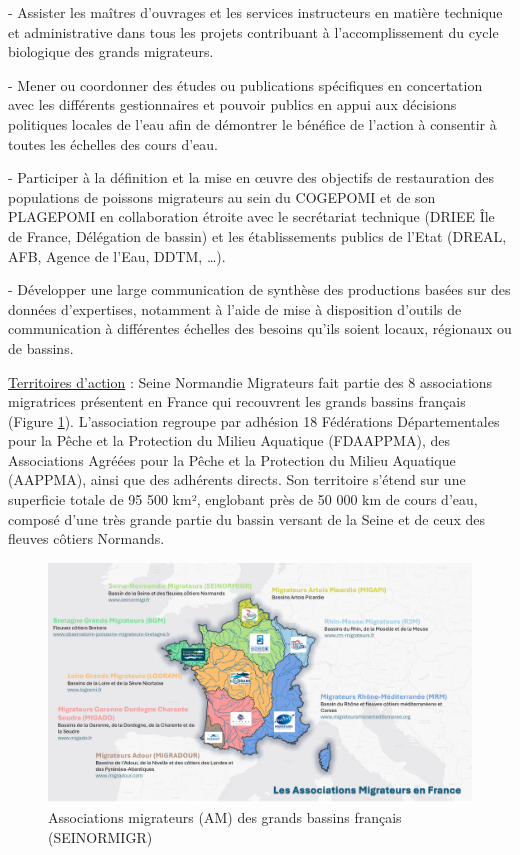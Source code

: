 \documentclass[11pt,titlepage,twoside]{article}\usepackage[]{graphicx}\usepackage[table]{xcolor}
\begin{document}
-	Assister les maîtres d’ouvrages et les services instructeurs en matière technique et administrative dans tous les projets contribuant à l’accomplissement du cycle biologique des grands migrateurs.

-	Mener ou coordonner des études ou publications spécifiques en concertation avec les différents gestionnaires et pouvoir publics en appui aux décisions politiques locales de l’eau afin de démontrer le bénéfice de l’action à consentir à toutes les échelles des cours d’eau.

-	Participer à la définition et la mise en œuvre des objectifs de restauration des populations de poissons migrateurs au sein du COGEPOMI et de son PLAGEPOMI en collaboration étroite avec le secrétariat technique (DRIEE Île de France, Délégation de bassin) et les établissements publics de l’Etat (DREAL, AFB, Agence de l’Eau, DDTM, …).

-	Développer une large communication de synthèse des productions basées sur des données d’expertises, notamment à l’aide de mise à disposition d’outils de communication à différentes échelles des besoins qu’ils soient locaux, régionaux ou de bassins.
\vspace{0.5cm}

\underline{Territoires d’action} :  Seine Normandie Migrateurs fait partie des 8 associations migratrices présentent en France qui recouvrent les grands bassins français (Figure \ref{AM_National}). 
L’association regroupe par adhésion 18 Fédérations Départementales pour la Pêche et la Protection du Milieu Aquatique (FDAAPPMA), des Associations Agréées pour la Pêche et la Protection du Milieu Aquatique (AAPPMA), ainsi que des adhérents directs. 
Son territoire s’étend sur une superficie totale de 95 500 km², englobant près de 50 000 km de cours d’eau, composé d’une très grande partie du bassin versant de la Seine et de ceux des fleuves côtiers Normands. 

\vspace{0.5cm}

\begin{figure}[htpb]
\centering
\includegraphics[width=\textwidth]{AM_National.png}
\caption{Associations migrateurs (AM) des grands bassins français (SEINORMIGR)}
\label{AM_National}
\end{figure}
\end{document}
